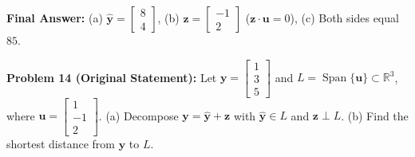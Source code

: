 \documentclass[11pt, letterpaper]{article}
\theoremstyle{definition}
\theoremstyle{remark}
\begin{document}
\textbf{Final Answer:} (a) $\hat{\mathbf{y}} = \begin{bmatrix} 8 \\ 4 \end{bmatrix}$, (b) $\mathbf{z} = \begin{bmatrix} -1 \\ 2 \end{bmatrix}$ ($\mathbf{z} \cdot \mathbf{u} = 0$), (c) Both sides equal $85$.

\medskip
\textbf{Problem 14 (Original Statement):} Let $\mathbf{y} = \begin{bmatrix} 1 \\ 3 \\ 5 \end{bmatrix}$ and $L = \operatorname{Span}\{\mathbf{u}\} \subset \mathbb{R}^3$, where $\mathbf{u} = \begin{bmatrix} 1 \\ -1 \\ 2 \end{bmatrix}$. (a) Decompose $\mathbf{y} = \hat{\mathbf{y}} + \mathbf{z}$ with $\hat{\mathbf{y}} \in L$ and $\mathbf{z} \perp L$. (b) Find the shortest distance from $\mathbf{y}$ to $L$.
\end{document}
